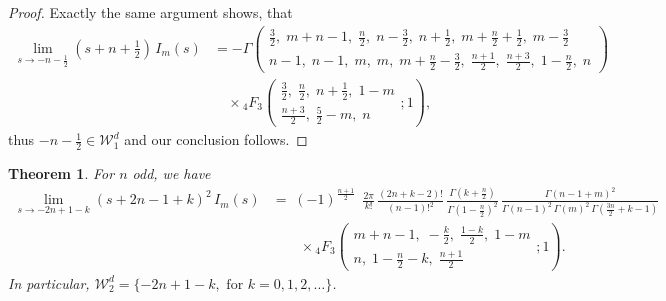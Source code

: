 \documentclass{article}
\theoremstyle{boldremark}
\newtheorem{theorem}{Theorem}[section]
\renewcommand\[{\begin{equation}}
\renewcommand\]{\end{equation}}
\theoremstyle{definition}
\numberwithin{equation}{section}
\begin{document}
\begin{proof}
Exactly the same argument shows, that 
\begin{align*}
     \lim_{s\rightarrow -n-\frac{1}{2}} (s+n+\frac{1}{2})\,I_m(s) &=
-\Gamma\!\left(
\begin{matrix}
\frac32, \; m+n-1,\; \frac n2,\; n-\frac32,\; n+\frac12,\;
m+\frac n2+\frac12,\; m-\frac32
\\[3pt]
n-1,\; n-1,\; m,\; m,\; m+\frac n2-\frac32,\;
\frac{n+1}{2},\; \frac{n+3}{2},\; 1-\frac n2,\; n
\end{matrix}
\right)
\\[6pt]
&\quad \times
{}_4F_3 \left(
\begin{matrix}
\frac32,\; \frac n2,\; n+\frac12,\; 1-m\\[3pt]
\frac{n+3}{2},\; \frac52-m,\; n
\end{matrix};1
\right),
 \end{align*}
thus $-n-\frac{1}{2} \in \mathcal{W}_1^d$ and our conclusion follows.
\end{proof}
\begin{theorem}
    For $n$ odd, we have
    \begin{align}\nonumber
\lim_{s \rightarrow -2n +1 -k}(s + 2n-1+k)^2\,I_{m}(s) &=\;(-1)^{\frac{n+1}{2}}\,
\frac{}{} \,\frac{2\pi}{k!}\,\frac{(2n+k-2)!}{(n-1)!^2}\,
\frac{\Gamma\!\left(k+\frac n2\right)}{\Gamma\!\left(1-\frac n2\right)^2}\,
\frac{\Gamma(n-1+m)^2}
{\Gamma(n-1)^2\,\Gamma(m)^2\,\Gamma\!\left(\frac{3n}{2}+k-1\right)}\,\\\label{opi}
&\qquad\times
{}_4F_3\!\left(
\begin{matrix}
m+n-1,\; -\frac k2,\; \frac{1-k}{2},\; 1-m \\
n,\; 1-\frac n2-k,\; \frac{n+1}{2}
\end{matrix}
;1
\right).
\end{align}
In particular, $\mathcal{W}^d_2 = \{-2n+1-k, \text{ for $k =0, 1,2, \dots$}\}$.
\end{theorem}
\end{document}
